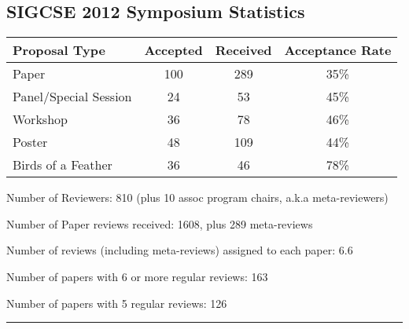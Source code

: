 \begin{center}
	\section*{SIGCSE 2012 Symposium Statistics} 
	\begin{tabular}{|l|c|c|c|}
	\hline
	Proposal Type & Accepted & Received & Acceptance Rate \\ \hline
	Paper & 100 & 289 & 35\% \\ \hline
	Panel/Special Session & 24 & 53 & 45\% \\ \hline
	Workshop & 36 & 78 & 46\% \\ \hline
	Poster & 48 & 109 & 44\% \\ \hline
	Birds of a Feather & 36 & 46 & 78\% \\ \hline
	\end{tabular}
\end{center}

Number of Reviewers:  810 (plus 10 assoc program chairs, a.k.a meta-reviewers)

Number of Paper reviews received: 1608, plus 289 meta-reviews

Number of reviews (including meta-reviews) assigned to each paper: 6.6

Number of papers with 6 or more regular reviews: 163

Number of papers with 5 regular reviews: 126


\noindent\rule{5in}{0.02cm}

